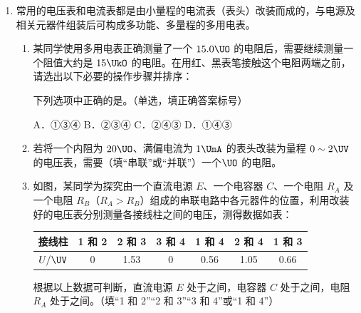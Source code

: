 \documentclass[\gkver]{gaokaozhenti}
\begin{document}
\begin{enumerate}
\item
常用的电压表和电流表都是由小量程的电流表（表头）改装而成的，与电源及相关元器件组装后可构成多功能、多量程的多用电表。
\begin{enumerate}
	\item
	某同学使用多用电表正确测量了一个 $15.0 \UO$ 的电阻后，需要继续测量一个阻值大约是 $15 \UkO$ 的电阻。在用红、黑表笔接触这个电阻两端之前，请选出以下必要的操作步骤并排序：
	下列选项中正确的是。（单选，填正确答案标号）

	A．①③④ \quad B．②③④ \quad C．②④③ \quad D．①④③
	\item
	若将一个内阻为 $20 \UO$、满偏电流为 $1 \UmA$ 的表头改装为量程 $0 \sim 2 \UV$ 的电压表，需要（填“串联”或“并联”）一个$\UO$ 的电阻。
	\item
	如图，某同学为探究由一个直流电源 $E$、一个电容器 $C$、一个电阻 $R_{A}$ 及一个电阻 $R_{B}$（$R_{A} > R_{B}$）组成的串联电路中各元器件的位置，利用改装好的电压表分别测量各接线柱之间的电压，测得数据如表：

	\begin{center}
	\begin{tabular}{|c|c|c|c|c|c|c|}
	\hline
	接线柱 & 1 和 2 & 2 和 3 & 3 和 4 & 1 和 4 & 2 和 4 & 1 和 3 \\ \hline
	$U/\UV$ & 0 & 1.53 & 0 & 0.56 & 1.05 & 0.66 \\ \hline
	\end{tabular}
	\end{center}

	根据以上数据可判断，直流电源 $E$ 处于之间，电容器 $C$ 处于之间，电阻 $R_{A}$ 处于之间。（填“1 和 2”“2 和 3”“3 和 4”或“1 和 4”）
\end{enumerate}
\end{enumerate}
\end{document}
